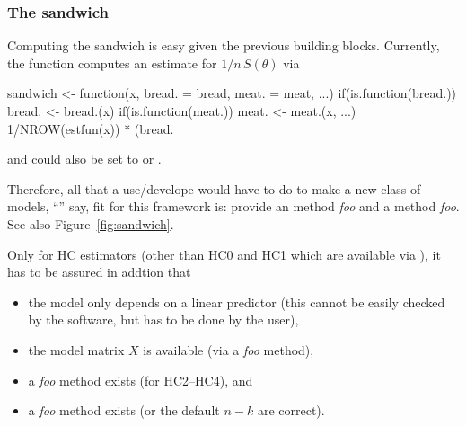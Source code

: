 \documentclass{Z}
\begin{document}


\subsubsection*{The sandwich}

Computing the sandwich is easy given the previous building blocks. Currently, the 
function  computes an estimate for $1/n \, S(\theta)$ via
\begin{Schunk}
\begin{Sinput}
sandwich <- function(x, bread. = bread, meat. = meat, ...)
{
  if(is.function(bread.)) bread. <- bread.(x)
  if(is.function(meat.)) meat. <- meat.(x, ...)
  1/NROW(estfun(x)) * (bread. %*% meat. %*% bread.)
}
\end{Sinput}
\end{Schunk}
and  could also be set to  or . 

Therefore, all that a
use/develope would have to do to make a new class of models, 
``'' say, fit for this framework is: 
provide an  method \emph{foo}\code{()}
and a  method \emph{foo}\code{()}. See also Figure~\ref{fig:sandwich}.

Only for HC estimators (other than HC0 and HC1 which are available via ),
it has to be assured in addtion that 
\begin{itemize}
  \item the model only depends on a linear predictor (this cannot be easily
        checked by the software, but has to be done by the user),
  \item the model matrix $X$ is available (via a \emph{foo}\code{()} method),
  \item a \emph{foo}\code{()} method exists (for HC2--HC4), and
  \item a \emph{foo}\code{()} method exists (or the default $n-k$ are correct).
\end{itemize}
\end{document}
